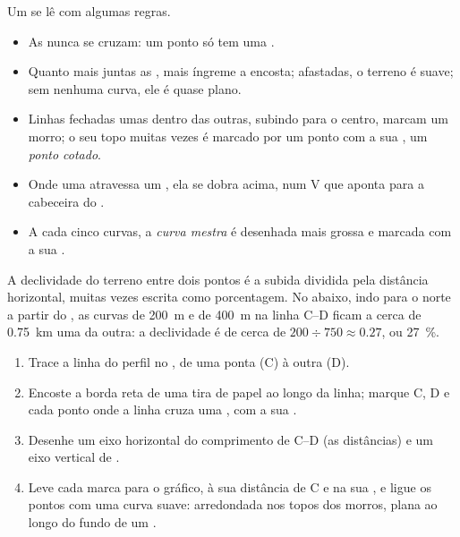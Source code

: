 Um  se lê com algumas regras.
\begin{itemize}
  \item As  nunca se cruzam: um ponto só tem uma .
  \item Quanto mais juntas as , mais íngreme a encosta;
        afastadas, o terreno é suave; sem nenhuma curva, ele é quase plano.
  \item Linhas fechadas umas dentro das outras, subindo para o centro,
        marcam um morro; o seu topo muitas vezes é marcado por um ponto com
        a sua , um \emph{ponto cotado}.
  \item Onde uma  atravessa um , ela se dobra  acima,
        num V que aponta para a cabeceira do .
  \item A cada cinco curvas, a \emph{curva mestra} é desenhada mais grossa
        e marcada com a sua .
\end{itemize}

A declividade do terreno entre dois pontos é a subida dividida pela
distância horizontal, muitas vezes escrita como porcentagem. No 
abaixo, indo para o norte a partir do , as curvas de \qty{200}{m} e de
\qty{400}{m} na linha C--D ficam a cerca de \qty{0.75}{km} uma da outra:
a declividade é de cerca de $200 \div 750
\approx 0.27$, ou \qty{27}{\%}.

\begin{method}
\begin{enumerate}
  \item Trace a linha do perfil no , de uma ponta (C) à outra (D).
  \item Encoste a borda reta de uma tira de papel ao longo da linha; marque
        C, D e cada ponto onde a linha cruza uma , com a sua
        .
  \item Desenhe um eixo horizontal do comprimento de C--D (as distâncias)
        e um eixo vertical de .
  \item Leve cada marca para o gráfico, à sua distância de C e na sua
        , e ligue os pontos com uma curva suave: arredondada nos
        topos dos morros, plana ao longo do fundo de um .
\end{enumerate}
\end{method}

